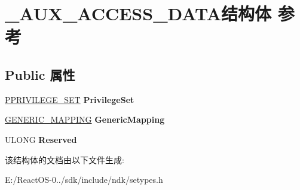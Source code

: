 \hypertarget{struct___a_u_x___a_c_c_e_s_s___d_a_t_a}{}\section{\+\_\+\+A\+U\+X\+\_\+\+A\+C\+C\+E\+S\+S\+\_\+\+D\+A\+T\+A结构体 参考}
\label{struct___a_u_x___a_c_c_e_s_s___d_a_t_a}
\subsection*{Public 属性}
\begin{DoxyCompactItemize}
\item 
\mbox{\label{struct___a_u_x___a_c_c_e_s_s___d_a_t_a_a87ac3ab889efcb620a5e377077b7d622}} 
\hyperlink{struct___p_r_i_v_i_l_e_g_e___s_e_t}{P\+P\+R\+I\+V\+I\+L\+E\+G\+E\+\_\+\+S\+ET} {\bfseries Privilege\+Set}
\item 
\mbox{\label{struct___a_u_x___a_c_c_e_s_s___d_a_t_a_a95e404c6c7b26bc62002db5de84c9bd9}} 
\hyperlink{struct___g_e_n_e_r_i_c___m_a_p_p_i_n_g}{G\+E\+N\+E\+R\+I\+C\+\_\+\+M\+A\+P\+P\+I\+NG} {\bfseries Generic\+Mapping}
\item 
\mbox{\label{struct___a_u_x___a_c_c_e_s_s___d_a_t_a_acf8b27a138f365b881ccf4f81e12224b}} 
U\+L\+O\+NG {\bfseries Reserved}
\end{DoxyCompactItemize}


该结构体的文档由以下文件生成\+:\begin{DoxyCompactItemize}
\item 
E\+:/\+React\+O\+S-\/0../sdk/include/ndk/setypes.\+h\end{DoxyCompactItemize}
